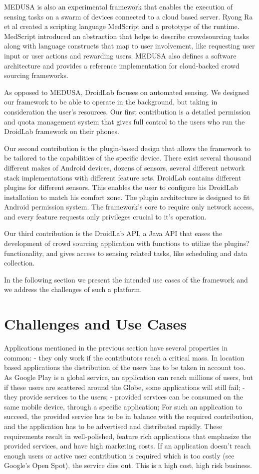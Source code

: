\documentclass[conference,letterpaper]{IEEEtran}
\begin{document}
MEDUSA is also an experimental framework that enables the execution of sensing tasks on a swarm of devices connected to a cloud based server. Ryong Ra et al created a scripting language MedScript and a prototype of the runtime. MedScript introduced an abstraction that helps to describe crowdsourcing tasks along with language constructs that map to user involvement, like requesting user input or user actions and rewarding users. MEDUSA also defines a software architecture and provides a reference implementation for cloud-backed crowd sourcing frameworks.

As opposed to MEDUSA, DroidLab focuses on automated sensing. We designed our framework to be able to operate in the background, but taking in consideration the user's resources. Our first contribution is a detailed permission and quota management system that gives full control to the users who run the DroidLab framework on their phones.

Our second contribution is the plugin-based design that allows the framework to be tailored to the capabilities of the specific device. There exist several thousand different makes of Android devices, dozens of sensors, several different network stack implementations with different feature sets. DroidLab contains different plugins for different sensors. This enables the user to configure his DroidLab installation to match his comfort zone. The plugin architecture is designed to fit Android permission system. The framework's core to require only network access, and every feature requests only privileges crucial to it's operation.

Our third contribution is the DroidLab API, a Java API that eases the development of crowd sourcing application with functions to utilize the plugins? functionality, and gives access to sensing related tasks, like scheduling and data collection.

In the following section we present the intended use cases of the framework and we address the challenges of such a platform.

\section{Challenges and Use Cases}
Applications mentioned in the previous section have several properties in common:
- they only work if the contributors reach a critical mass. In location based applications the distribution of the users has to be taken in account too. As Google Play is a global service, an application can reach millions of users, but if these users are scattered around the Globe, some applications will still fail;
- they provide services to the users;
- provided services can be consumed on the same mobile device, through a specific application;
For such an application to succeed, the provided service has to be in balance with the required contribution, and the application has to be advertised and distributed rapidly. These requirements result in well-polished, feature rich applications that emphasize the provided services, and have high marketing costs. If an application doesn't reach enough users or active user contribution is required which is too costly (see Google's Open Spot), the service dies out. This is a high cost, high risk business.
\end{document}
